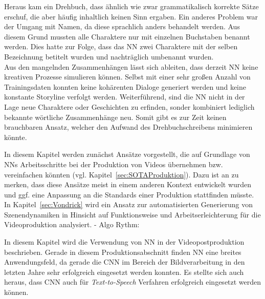 \documentclass[times, 12pt,twocolumn]{article}
\begin{document}
Heraus kam ein Drehbuch, dass ähnlich wie \cite{DrehbuchSV} zwar grammatikalisch korrekte Sätze erschuf, die aber häufig inhaltlich keinen Sinn ergaben. Ein anderes Problem war der Umgang mit Namen, da diese sprachlich anders behandelt werden. Aus diesem Grund mussten alle Charaktere nur mit einzelnen Buchstaben benannt werden. Dies hatte zur Folge, dass das NN zwei Charaktere mit der selben Bezeichnung betitelt wurden und nachträglich umbenannt wurden.\\

Aus den mangelnden Zusammenhängen lässt sich ableiten, dass derzeit NN keine kreativen Prozesse simulieren können. Selbst mit einer sehr großen Anzahl von Trainingsdaten konnten keine kohärenten Dialoge generiert werden und keine konstante Storyline verfolgt werden. Weiterführend, sind die NN nicht in der Lage neue Charaktere oder Geschichten zu erfinden, sonder kombiniert lediglich bekannte wörtliche Zusammenhänge neu. Somit gibt es zur Zeit keinen brauchbaren Ansatz, welcher den Aufwand des Drehbuchschreibens minimieren könnte. 

 \label{sec:Produktion}
In diesem Kapitel werden zunächst Ansätze vorgestellt, die auf Grundlage von NNs Arbeitsschritte bei der Produktion von Videos übernehmen bzw. vereinfachen könnten (vgl. Kapitel~\ref{sec:SOTAProduktion}). Dazu ist an zu merken, dass diese Ansätze meist in einem anderen Kontext entwickelt wurden und ggf. eine Anpassung an die Standards einer Produktion stattfinden müsste. \\

In Kapitel~\ref{sec:Vondrick} wird ein Ansatz zur automatisierten Generierung von Szenendynamiken in Hinsicht auf Funktionsweise und Arbeitserleichterung für die Videoproduktion analysiert. 
 \label{sec:SOTAProduktion}
- Algo Rythm: %
 \label{sec:Vondrick}

 \label{sec:Postroduktion}

In diesem Kapitel wird die Verwendung von NN in der Videopostproduktion beschrieben. Gerade in diesem Produktionsabschnitt finden NN eine breites Anwendungsfeld, da gerade die CNN im Bereich der Bildverarbeitung in den letzten Jahre sehr erfolgreich eingesetzt werden konnten. Es stellte sich auch heraus, dass CNN auch für \textit{Text-to-Speech} Verfahren erfolgreich eingesetzt werden können.\\
\end{document}
